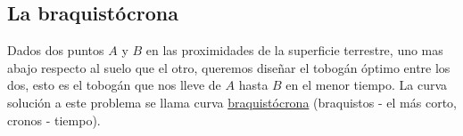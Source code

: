 \begin{subappendices}


\section{La braquistócrona}


\begin{problema} Dados dos puntos $A$ y $B$ en las proximidades de la superficie terrestre, uno mas abajo respecto al suelo que el otro,
queremos diseñar el tobogán óptimo entre los dos,
esto es el tobogán que nos lleve de $A$ hasta $B$ en el menor tiempo. La curva solución a este problema se llama curva
\href{http://es.wikipedia.org/wiki/Curva_braquistócrona}{braquistócrona} (braquistos - el más corto, cronos - tiempo).
\end{problema}\vspace{-1cm}\link
%
%
%


\begin{center}
\end{center}



\end{subappendices}
